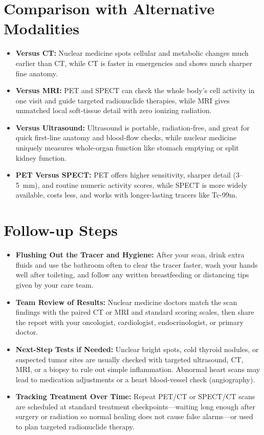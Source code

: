 \section{Comparison with Alternative Modalities}
\begin{itemize}
  \item \textbf{Versus CT:} Nuclear medicine spots cellular and metabolic changes much earlier than CT, while CT is faster in emergencies and shows much sharper fine anatomy.
  \item \textbf{Versus MRI:} PET and SPECT can check the whole body's cell activity in one visit and guide targeted radionuclide therapies, while MRI gives unmatched local soft-tissue detail with zero ionizing radiation.
  \item \textbf{Versus Ultrasound:} Ultrasound is portable, radiation-free, and great for quick first-line anatomy and blood-flow checks, while nuclear medicine uniquely measures whole-organ function like stomach emptying or split kidney function.
  \item \textbf{PET Versus SPECT:} PET offers higher sensitivity, sharper detail (3--5~mm), and routine numeric activity scores, while SPECT is more widely available, costs less, and works with longer-lasting tracers like Tc-99m.
\end{itemize}

\section{Follow-up Steps}
\begin{itemize}
  \item \textbf{Flushing Out the Tracer and Hygiene:} After your scan, drink extra fluids and use the bathroom often to clear the tracer faster, wash your hands well after toileting, and follow any written breastfeeding or distancing tips given by your care team.
  \item \textbf{Team Review of Results:} Nuclear medicine doctors match the scan findings with the paired CT or MRI and standard scoring scales, then share the report with your oncologist, cardiologist, endocrinologist, or primary doctor.
  \item \textbf{Next-Step Tests if Needed:} Unclear bright spots, cold thyroid nodules, or suspected tumor sites are usually checked with targeted ultrasound, CT, MRI, or a biopsy to rule out simple inflammation. Abnormal heart scans may lead to medication adjustments or a heart blood-vessel check (angiography).
  \item \textbf{Tracking Treatment Over Time:} Repeat PET/CT or SPECT/CT scans are scheduled at standard treatment checkpoints---waiting long enough after surgery or radiation so normal healing does not cause false alarms---or used to plan targeted radionuclide therapy.
\end{itemize}


